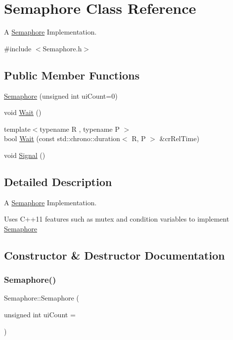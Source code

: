 \hypertarget{class_semaphore}{}\section{Semaphore Class Reference}
\label{class_semaphore}


A \hyperlink{class_semaphore}{Semaphore} Implementation.  




{\ttfamily \#include $<$Semaphore.\+h$>$}

\subsection*{Public Member Functions}
\begin{DoxyCompactItemize}
\item 
\hyperlink{class_semaphore_a0d9290d316636875ca85d1d78950a817}{Semaphore} (unsigned int ui\+Count=0)
\item 
void \hyperlink{class_semaphore_a72aabebf026e3a8b1f3e4d0fa8ee1eda}{Wait} ()
\item 
{\footnotesize template$<$typename R , typename P $>$ }\\bool \hyperlink{class_semaphore_a7f700173ae86ae623684109066e07656}{Wait} (const std\+::chrono\+::duration$<$ R, P $>$ \&cr\+Rel\+Time)
\item 
void \hyperlink{class_semaphore_a86f92f738b4486439b296d8e235895f2}{Signal} ()
\end{DoxyCompactItemize}


\subsection{Detailed Description}
A \hyperlink{class_semaphore}{Semaphore} Implementation. 

Uses C++11 features such as mutex and condition variables to implement \hyperlink{class_semaphore}{Semaphore} 

\subsection{Constructor \& Destructor Documentation}
\mbox{\label{class_semaphore_a0d9290d316636875ca85d1d78950a817}} 
\subsubsection{\texorpdfstring{Semaphore()}{Semaphore()}}
{\footnotesize\ttfamily Semaphore\+::\+Semaphore (\begin{DoxyParamCaption}\item[{unsigned int}]{ui\+Count = {} }\end{DoxyParamCaption})\hspace{0.3cm}{\ttfamily [inline]}}



